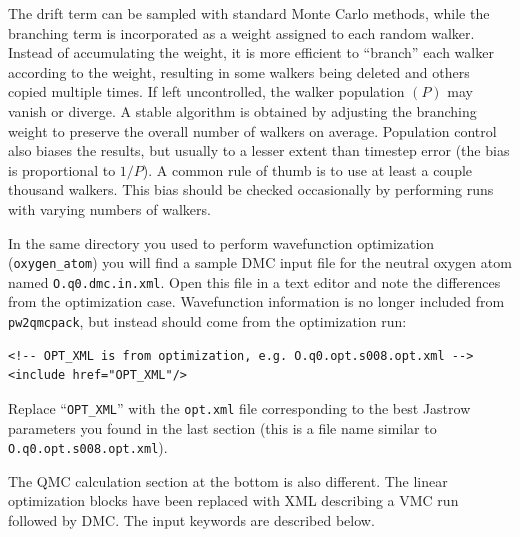 {The drift term can be sampled with standard Monte Carlo methods, while the branching term is incorporated as a weight assigned to each random walker.  Instead of accumulating the weight, it is more efficient to ``branch'' each walker according to the weight, resulting in some walkers being deleted and others copied multiple times.  If left uncontrolled, the walker population $(P)$ may vanish or diverge.  A stable algorithm is obtained by adjusting the branching weight to preserve the overall number of walkers on average.  Population control also biases the results, but usually to a lesser extent than timestep error (the bias is proportional to $1/P$).  A common rule of thumb is to use at least a couple thousand walkers.  This bias should be checked occasionally by performing runs with varying numbers of walkers.
}


In the same directory you used to perform wavefunction optimization (\texttt{oxygen\_atom}) you will find a sample DMC input file for the neutral oxygen atom named \texttt{O.q0.dmc.in.xml}.  Open this file in a text editor and note the differences from the optimization case.  Wavefunction information is no longer included from \texttt{pw2qmcpack}, but instead should come from the optimization run:
\begin{lstlisting}
<!-- OPT_XML is from optimization, e.g. O.q0.opt.s008.opt.xml -->
<include href="OPT_XML"/>
\end{lstlisting}
\noindent
Replace ``\texttt{OPT\_XML}'' with the \texttt{opt.xml} file corresponding to the best Jastrow parameters you found in the last section (this is a file name similar to \verb|O.q0.opt.s008.opt.xml|).  

The QMC calculation section at the bottom is also different.  The linear optimization blocks have been replaced with XML describing a VMC run followed by DMC.  The input keywords are described below.

